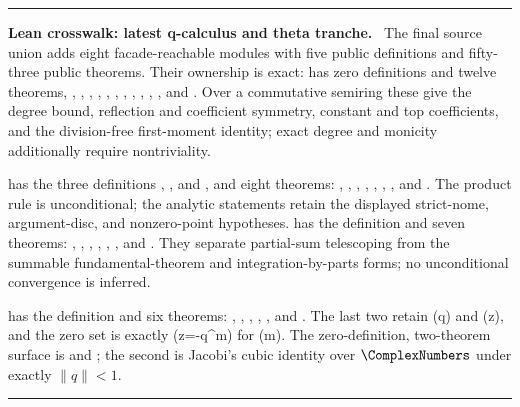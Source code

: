 \documentclass[11pt,oneside]{article}
\numberwithin{equation}{section}
\theoremstyle{definition}
\theoremstyle{remark}
\newenvironment{statusbox}[1]{%
  \par\medskip\noindent\begin{center}\begin{minipage}{0.94\textwidth}%
  \color{linkblue}\hrule\vspace{0.65em}%
  \color{black}\textbf{\color{linkblue}#1.}\ }{%
  \par\vspace{0.65em}\color{linkblue}\hrule
  \end{minipage}\end{center}\medskip}
\begin{document}
\begin{statusbox}{Lean crosswalk: latest q-calculus and theta tranche}
The final source union adds eight facade-reachable modules with five public
definitions and fifty-three public theorems.  Their ownership is exact:
 has zero definitions and twelve
theorems,
, ,
, ,
, ,
,
, ,
, , and
.  Over a commutative
semiring these give the degree bound, reflection and coefficient symmetry,
constant and top coefficients, and the division-free first-moment identity;
exact degree and monicity additionally require nontriviality.

 has the three definitions ,
, and , and eight theorems:
, ,
, , ,
, , and
.  The product rule is unconditional; the analytic
statements retain the displayed strict-nome, argument-disc, and nonzero-point
hypotheses.   has the definition
 and seven theorems:
, ,
, ,
, , and
.  They separate partial-sum telescoping from
the summable fundamental-theorem and integration-by-parts forms; no
unconditional convergence is inferred.

 has the definition 
and six theorems:
, ,
, ,
, and .
The last two retain (q) and (z), and the zero set is exactly
(z=-q^m) for (m\in\IntegerNumbers).  The zero-definition,
two-theorem  surface is
 and ; the
second is Jacobi's cubic identity over \(\ComplexNumbers\) under exactly
\(\lVert q\rVert<1\).


\end{statusbox}
\end{document}
